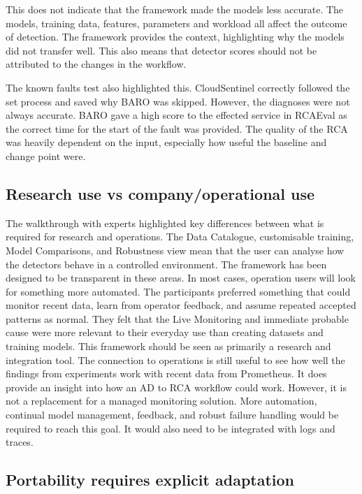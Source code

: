 This does not indicate that the framework made the models less accurate. The models, training data, features, parameters and workload all affect the outcome of detection. The framework provides the context, highlighting why the models did not transfer well. This also means that detector scores should not be attributed to the changes in the workflow.

The known faults test also highlighted this. CloudSentinel correctly followed the set process and saved why BARO was skipped. However, the diagnoses were not always accurate. BARO gave a high score to the effected service in RCAEval as the correct time for the start of the fault was provided. The quality of the RCA was heavily dependent on the input, especially how useful the baseline and change point were.

\subsection{Research use vs company/operational use}

The walkthrough with experts highlighted key differences between what is required for research and operations. The Data Catalogue, customisable training, Model Comparisons, and Robustness view mean that the user can analyse how the detectors behave in a controlled environment. The framework has been designed to be transparent in these areas. In most cases, operation users will look for something more automated. The participants preferred something that could monitor recent data, learn from operator feedback, and assume repeated accepted patterns as normal. They felt that the Live Monitoring and immediate probable cause were more relevant to their everyday use than creating datasets and training models. This framework should be seen as primarily a research and integration tool. The connection to operations is still useful to see how well the findings from experiments work with recent data from Prometheus. It does provide an insight into how an AD to RCA workflow could work. However, it is not a replacement for a managed monitoring solution. More automation, continual model management, feedback, and robust failure handling would be required to reach this goal. It would also need to be integrated with logs and traces.

\subsection{Portability requires explicit adaptation}

